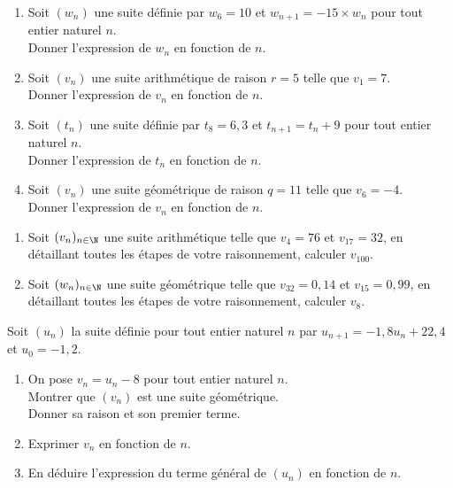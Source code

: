 \documentclass[11pt]{article}
\begin{document}
\begin{center}
\brouillon
\recherche 
{}
\end{center}

\begin{exercicedevoir}[4]
\begin{enumerate}
\item Soit $(w_n)$ une suite définie par $w_{6}=10$ et  
$w_{n+1}=-15\times w_n$ pour tout entier naturel $n$.\\
Donner l'expression de $w_n$ en fonction de $n$.
\item Soit $(v_n)$ une suite arithmétique de raison $r=5$ telle que $v_{1}=7$.\\
Donner l'expression de $v_n$ en fonction de $n$.
\item Soit $(t_n)$ une suite définie par $t_{8}=6{,}3$ et  
$t_{n+1}=t_n+9$ pour tout entier naturel $n$.\\
Donner l'expression de $t_n$ en fonction de $n$.
\item Soit $(v_n)$ une suite géométrique de raison $q=11$ telle que $v_{6}=-4$.\\
Donner l'expression de $v_n$ en fonction de $n$.
\end{enumerate}
\end{exercicedevoir}

\begin{exercicedevoir}[4]
\begin{enumerate}
\item Soit $(v_n)_{n \in \N}$ une suite arithmétique telle que $v_4=76$ et $v_{17}=32$, en détaillant toutes les étapes de votre raisonnement, calculer $v_{100}$.
\item Soit $(w_n)_{n \in \N}$ une suite géométrique telle que $v_{32}=0,14$ et $v_{15}=0,99$, en détaillant toutes les étapes de votre raisonnement, calculer $v_{8}$.
\end{enumerate}
\end{exercicedevoir}

\begin{exercicedevoir}[4]
Soit $(u_n)$ la suite définie pour tout entier naturel $n$ par $u_{n+1}=-1{,}8u_n +22{,}4$ et $u_0=-1{,}2$.
\begin{enumerate}
\item On pose $v_n=u_n -8$ pour tout entier naturel $n$.\\
Montrer que  $(v_n)$ est une suite géométrique.\\
Donner sa raison et son premier terme.
\item Exprimer $v_n$ en fonction de $n$.
\item En déduire l'expression du terme général de $(u_n)$ en fonction de $n$.
\end{enumerate}
\end{exercicedevoir}
\end{document}
